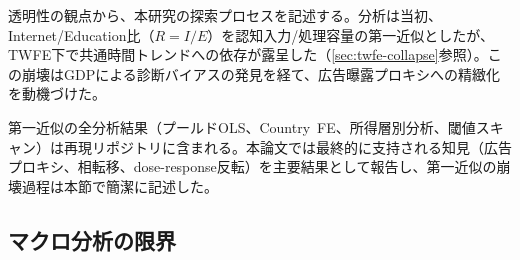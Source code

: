 \documentclass[a4paper,11pt,titlepage]{article}
\begin{document}
透明性の観点から、本研究の探索プロセスを記述する。分析は当初、Internet/Education比（$R = I/E$）を認知入力/処理容量の第一近似としたが、TWFE下で共通時間トレンドへの依存が露呈した（\cref{sec:twfe-collapse}参照）。この崩壊はGDPによる診断バイアスの発見を経て、広告曝露プロキシへの精緻化を動機づけた。

第一近似の全分析結果（プールドOLS、Country~FE、所得層別分析、閾値スキャン）は再現リポジトリに含まれる。本論文では最終的に支持される知見（広告プロキシ、相転移、dose-response反転）を主要結果として報告し、第一近似の崩壊過程は本節で簡潔に記述した。


\subsection{マクロ分析の限界}\label{sec:macro-limits}
\end{document}
